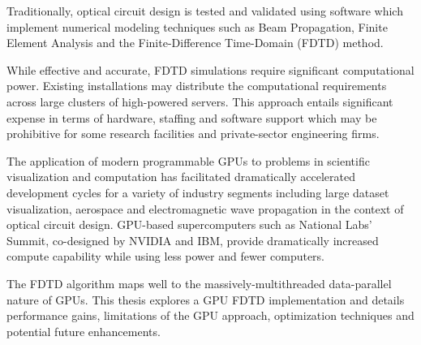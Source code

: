 Traditionally, optical circuit design is tested and validated using software which implement numerical modeling techniques such as Beam Propagation, Finite Element Analysis and the Finite-Difference Time-Domain (FDTD) method.

While effective and accurate, FDTD simulations require significant computational power. Existing installations may distribute the computational requirements across large clusters of high-powered servers. This approach entails significant expense in terms of hardware, staffing and software support which may be prohibitive for some research facilities and private-sector engineering firms.

The application of modern programmable GPUs to problems in scientific visualization and computation has facilitated dramatically accelerated development cycles for a variety of industry segments including large dataset visualization\cite{raycasting}, aerospace\cite{Strzodka2013381} and electromagnetic wave propagation in the context of optical circuit design. GPU-based supercomputers such as National Labs' Summit\cite{nvidiaNationalLabs}, co-designed by NVIDIA and IBM, provide dramatically increased compute capability while using less power and fewer computers. 

The FDTD algorithm maps well to the massively-multithreaded data-parallel nature of GPUs. This thesis explores a GPU FDTD implementation and details performance gains, limitations of the GPU approach, optimization techniques and potential future enhancements. 